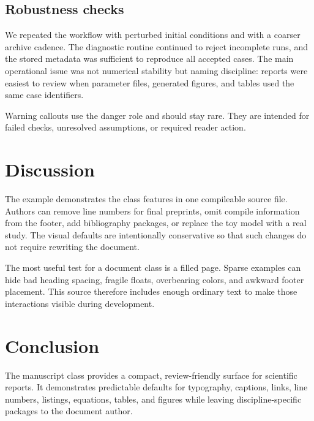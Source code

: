 \documentclass[\oritoneexamplemode,11pt]{oritone-manuscript}
\begin{document}
\subsection{Robustness checks}

We repeated the workflow with perturbed initial conditions and with a coarser
archive cadence. The diagnostic routine continued to reject incomplete runs,
and the stored metadata was sufficient to reproduce all accepted cases. The
main operational issue was not numerical stability but naming discipline:
reports were easiest to review when parameter files, generated figures, and
tables used the same case identifiers.

\begin{oritonewarning}
Warning callouts use the danger role and should stay rare. They are intended for
failed checks, unresolved assumptions, or required reader action.
\end{oritonewarning}

\section{Discussion}
\label{sec:discussion}

The example demonstrates the class features in one compileable source file.
Authors can remove line numbers for final preprints, omit compile information
from the footer, add bibliography packages, or replace the toy model with a real
study. The visual defaults are intentionally conservative so that such changes
do not require rewriting the document.

The most useful test for a document class is a filled page. Sparse examples can
hide bad heading spacing, fragile floats, overbearing colors, and awkward footer
placement. This source therefore includes enough ordinary text to make those
interactions visible during development.

\section{Conclusion}

The manuscript class provides a compact, review-friendly surface for scientific
reports. It demonstrates predictable defaults for typography, captions, links,
line numbers, listings, equations, tables, and figures while leaving
discipline-specific packages to the document author.
\end{document}
